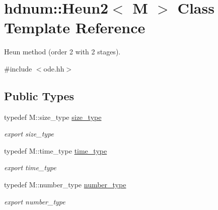 \hypertarget{classhdnum_1_1Heun2}{
\section{hdnum::Heun2$<$ M $>$ Class Template Reference}
\label{classhdnum_1_1Heun2}
}


Heun method (order 2 with 2 stages).  




{\ttfamily \#include $<$ode.hh$>$}

\subsection*{Public Types}
\begin{DoxyCompactItemize}
\item 
\hypertarget{classhdnum_1_1Heun2_a32d59e62cf1c8dcc50cd2583fae3bf09}{
typedef M::size\_\-type \hyperlink{classhdnum_1_1Heun2_a32d59e62cf1c8dcc50cd2583fae3bf09}{size\_\-type}}
\label{classhdnum_1_1Heun2_a32d59e62cf1c8dcc50cd2583fae3bf09}

\begin{DoxyCompactList}\small\item\em export size\_\-type \item\end{DoxyCompactList}\item 
\hypertarget{classhdnum_1_1Heun2_ac2e59a8551ffbce1455c0fd5266965fd}{
typedef M::time\_\-type \hyperlink{classhdnum_1_1Heun2_ac2e59a8551ffbce1455c0fd5266965fd}{time\_\-type}}
\label{classhdnum_1_1Heun2_ac2e59a8551ffbce1455c0fd5266965fd}

\begin{DoxyCompactList}\small\item\em export time\_\-type \item\end{DoxyCompactList}\item 
\hypertarget{classhdnum_1_1Heun2_af16dadf05575fe6ec2c0602fedfe8d2b}{
typedef M::number\_\-type \hyperlink{classhdnum_1_1Heun2_af16dadf05575fe6ec2c0602fedfe8d2b}{number\_\-type}}
\label{classhdnum_1_1Heun2_af16dadf05575fe6ec2c0602fedfe8d2b}

\begin{DoxyCompactList}\small\item\em export number\_\-type \item\end{DoxyCompactList}\end{DoxyCompactItemize}
